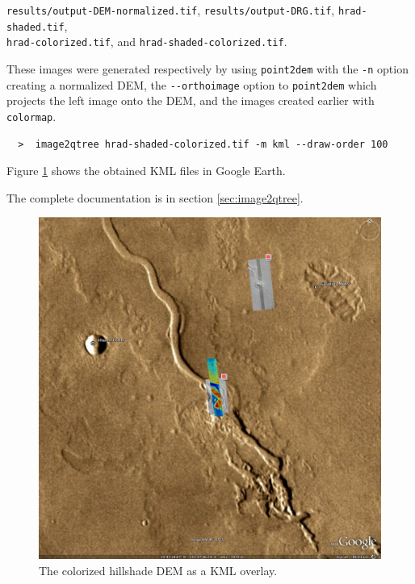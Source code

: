\texttt{results/output-DEM-normalized.tif}, \texttt{results/output-DRG.tif}, \texttt{hrad-shaded.tif}, \\
\texttt{hrad-colorized.tif}, and \texttt{hrad-shaded-colorized.tif}.

These images were generated respectively by using \texttt{point2dem}
with the \texttt{-n} option creating a normalized DEM, the
\texttt{-\/-orthoimage} option to \texttt{point2dem} which projects the
left image onto the DEM, and the images created earlier with
\texttt{colormap}.

\begin{verbatim}
  >  image2qtree hrad-shaded-colorized.tif -m kml --draw-order 100
\end{verbatim}

Figure \ref{hrad-kml} shows the obtained KML files in Google Earth.

The complete documentation is in section \ref{sec:image2qtree}.

\begin{figure}[b!]
\begin{center}
\includegraphics[width=6in]{images/p19-googlemars.png}
\caption[Hrad shaded colorized DEM as a KML overlay] {
    \label{hrad-kml}
        The colorized hillshade DEM as a KML overlay.  }
\end{center}
\end{figure}

